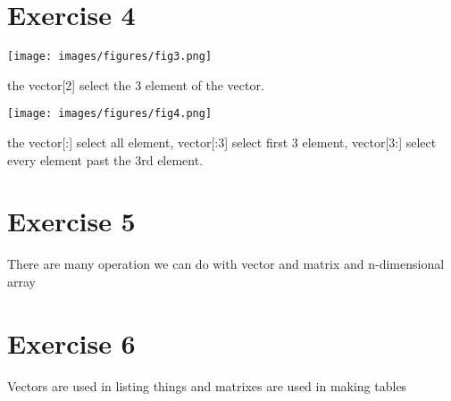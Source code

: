 \documentclass[12pt,titlepage]{article}
\begin{document}
\section*{Exercise 4}
\begin{center}
    \texttt{[image: images/figures/fig3.png]}
\end{center}
the vector[2] select the 3 element of the vector. 
\begin{center}
    \texttt{[image: images/figures/fig4.png]}
\end{center}
the vector[:] select all element, vector[:3] select first 3 element, vector[3:] select every element past the 3rd element.
\section*{Exercise 5}
There are many operation we can do with vector and matrix and n-dimensional array
\section*{Exercise 6}
Vectors are used in listing things and matrixes are used in making tables
\end{document}
